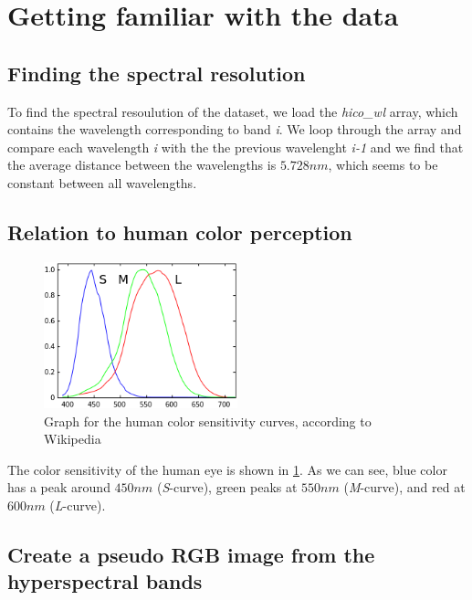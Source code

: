\section{Getting familiar with the data}

\subsection{Finding the spectral resolution}

To find the spectral resoulution of the dataset, we load the \textit{hico\_wl} array, which contains the
wavelength corresponding to band \textit{i}. We loop through the array and compare each wavelength
\textit{i} with the the previous wavelenght \textit{i-1} and we find that the average distance between
the wavelengths is $5.728 nm$, which seems to be constant between all wavelengths. 

\subsection{Relation to human color perception}

\begin{figure}
    \centering
    \includegraphics[width=0.5\textwidth]{../fig/human_spectrum.png}
    \caption{Graph for the human color sensitivity curves, according to Wikipedia \cite{website:wiki_spectral}}
    \label{fig:human_spectra}
\end{figure}

The color sensitivity of the human eye is shown in \cref{fig:human_spectra}. As we can 
see, blue color has a peak around $450 nm$ (\textit{S}-curve), green peaks at $550 nm$ 
(\textit{M}-curve), and red at $600 nm$ (\textit{L}-curve). 

\subsection{Create a pseudo RGB image from the hyperspectral bands}

